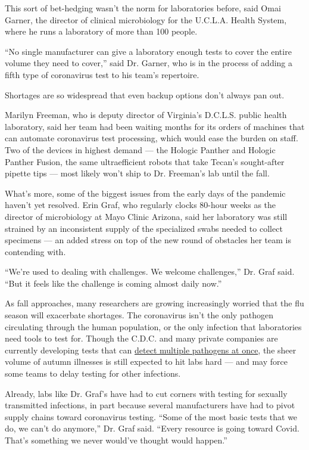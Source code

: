 This sort of bet-hedging wasn't the norm for laboratories before, said
Omai Garner, the director of clinical microbiology for the U.C.L.A.
Health System, where he runs a laboratory of more than 100 people.

``No single manufacturer can give a laboratory enough tests to cover the
entire volume they need to cover,'' said Dr. Garner, who is in the
process of adding a fifth type of coronavirus test to his team's
repertoire.

Shortages are so widespread that even backup options don't always pan
out.

Marilyn Freeman, who is deputy director of Virginia's D.C.L.S. public
health laboratory, said her team had been waiting months for its orders
of machines that can automate coronavirus test processing, which would
ease the burden on staff. Two of the devices in highest demand --- the
Hologic Panther and Hologic Panther Fusion, the same ultraefficient
robots that take Tecan's sought-after pipette tips --- most likely won't
ship to Dr. Freeman's lab until the fall.

What's more, some of the biggest issues from the early days of the
pandemic haven't yet resolved. Erin Graf, who regularly clocks 80-hour
weeks as the director of microbiology at Mayo Clinic Arizona, said her
laboratory was still strained by an inconsistent supply of the
specialized swabs needed to collect specimens --- an added stress on top
of the new round of obstacles her team is contending with.

``We're used to dealing with challenges. We welcome challenges,'' Dr.
Graf said. ``But it feels like the challenge is coming almost daily
now.''

As fall approaches, many researchers are growing increasingly worried
that the flu season will exacerbate shortages. The coronavirus isn't the
only pathogen circulating through the human population, or the only
infection that laboratories need tools to test for. Though the C.D.C.
and many private companies are currently developing tests that can
\href{https://www.cdc.gov/coronavirus/2019-ncov/lab/multiplex.html}{detect
multiple pathogens at once}, the sheer volume of autumn illnesses is
still expected to hit labs hard --- and may force some teams to delay
testing for other infections.

Already, labs like Dr. Graf's have had to cut corners with testing for
sexually transmitted infections, in part because several manufacturers
have had to pivot supply chains toward coronavirus testing. ``Some of
the most basic tests that we do, we can't do anymore,'' Dr. Graf said.
``Every resource is going toward Covid. That's something we never
would've thought would happen.''

